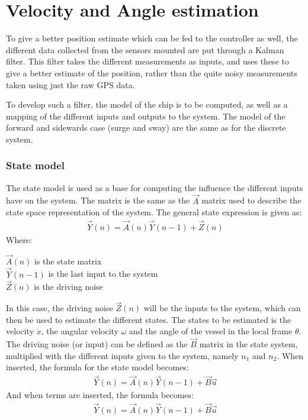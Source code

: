 \chapter{Velocity and Angle estimation}
To give a better position estimate which can be fed to the controller as well, the different data collected from the sensors mounted are put through a Kalman filter. This filter takes the different measurements as inputs, and uses these to give a better estimate of the position, rather than the quite noisy measurements taken using just the raw \ac{GPS} data. 

To develop such a filter, the model of the ship is to be computed, as well as a mapping of the different inputs and outputs to the system. The model of the forward and sidewards case (surge and sway) are the same as for the discrete system. 

\subsection{State model}
The state model is used as a base for computing the influence the different inputs have on the system. The matrix is the same as the $\vec{A}$ matrix used to describe the state space representation of the system. The general state expression is given as:
\begin{align}
\vec{Y}(n) = \vec{A}(n)\vec{Y}(n-1) + \vec{Z}(n)
\end{align}
\noindent Where:
\begin{ffk}
$\vec{A}(n)$ is the state matrix\\
$\vec{Y}(n-1)$ is the last input to the system\\
$\vec{Z}(n)$ is the driving noise
\end{ffk}
In this case, the driving noise $\vec{Z}(n)$ will be the inputs to the system, which can then be used to estimate the different states. The states to be estimated is the velocity $\dot{x}$, the angular velocity $\omega$ and the angle of the vessel in the local frame $\theta$. The driving noise (or input) can be defined as the $\vec{B}$ matrix in the state system, multiplied with the different inputs given to the system, namely $n_1$ and $n_2$. When inserted, the formula for the state model becomes:
\begin{align}
\vec{Y}(n) = \vec{A}(n)\vec{Y}(n-1) + \vec{B}\vec{u}
\end{align}
And when terms are inserted, the formula becomes: 
\begin{align}
\vec{Y}(n) = \vec{A}(n)\vec{Y}(n-1) + \vec{B}\vec{u}
\end{align}

